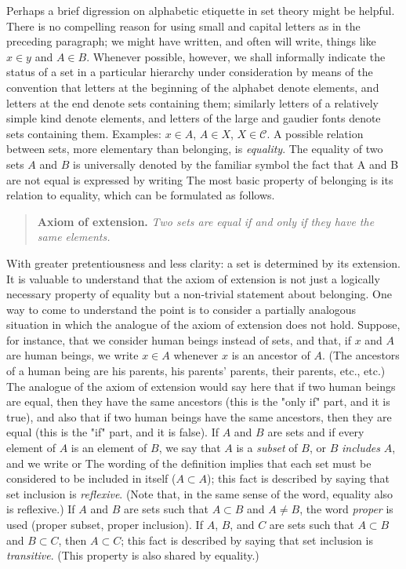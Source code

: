   Perhaps a brief digression on alphabetic etiquette in set theory might be helpful. 
 There is no compelling reason for using small and capital letters as in the preceding paragraph; we might have written, and often will write, things like $x \in y$ and $A \in B$. 
 Whenever possible, however, we shall informally indicate the status of a set in a particular hierarchy under consideration by means of the convention that letters at the beginning of the alphabet denote elements, and letters at the end denote sets containing them; similarly letters of a relatively simple kind denote elements, and letters of the large and gaudier fonts denote sets containing them. 
 Examples: $x \in A$, $A \in X$, $X \in \mathcal{C}$. 
 A possible relation between sets, more elementary than belonging, is \textit{equality}. 
 The equality of two sets $A$ and $B$ is universally denoted by the familiar symbol  the fact that A and B are not equal is expressed by writing  
 The most basic property of belonging is its relation to equality, which can be formulated as follows.


  \begin{quote} 
 \textbf{Axiom of extension.} 
 \textit{Two sets are equal if and only if they have the same elements.} 
 \end{quote}


  With greater pretentiousness and less clarity: a set is determined by its extension. 
 It is valuable to understand that the axiom of extension is not just a logically necessary property of equality but a non-trivial statement about belonging. 
 One way to come to understand the point is to consider a partially analogous situation in which the analogue of the axiom of extension does not hold. 
 Suppose, for instance, that we consider human beings instead of sets, and that, if $x$ and $A$ are human beings, we write $x \in A$ whenever $x$ is an ancestor of $A$. 
 (The ancestors of a human being are his parents, his parents' parents, their parents, etc., etc.) 
 The analogue of the axiom of extension would say here that if two human beings are equal, then they have the same ancestors (this is the "only if" part, and it is true), and also that if two human beings have the same ancestors, then they are equal (this is the "if" part, and it is false). 
 If $A$ and $B$ are sets and if every element of $A$ is an element of $B$, we say that $A$ is a \textit{subset} of $B$, or $B$ \textit{includes} $A$, and we write  or  
 The wording of the definition implies that each set must be considered to be included in itself ($A \subset A$); this fact is described by saying that set inclusion is \textit{reflexive}. (Note that, in the same sense of the word, equality also is reflexive.) 
 If $A$ and $B$ are sets such that $A \subset B$ and $A \neq B$, the word \textit{proper} is used (proper subset, proper inclusion). 
 If $A$, $B$, and $C$ are sets such that $A \subset B$ and $B \subset C$, then $A \subset C$; this fact is described by saying that set inclusion is \textit{transitive}. 
 (This property is also shared by equality.)


